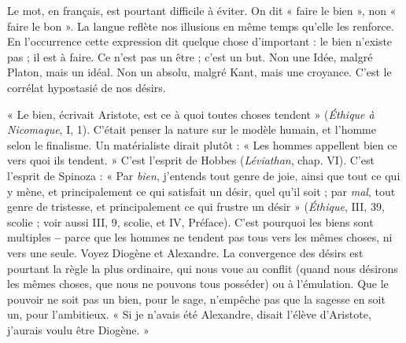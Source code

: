 Le mot, en français, est pourtant difficile à éviter. On dit « faire le bien »,
non « faire le bon ». La langue reflète nos illusions en même temps qu’elle les
renforce. En l’occurrence cette expression dit quelque chose d’important : le
bien n'existe pas ; il est à faire. Ce n’est pas un être ; c’est un but. Non une
Idée, malgré Platon, mais un idéal. Non un absolu, malgré Kant, mais une
croyance. C’est le corrélat hypostasié de nos désirs.

« Le bien, écrivait Aristote, est ce à quoi toutes choses tendent » ({\it Éthique à
Nicomaque}, I, 1). C'était penser la nature sur le modèle humain, et l’homme
selon le finalisme. Un matérialiste dirait plutôt : « Les hommes appellent bien
ce vers quoi ils tendent. » C’est l’esprit de Hobbes ({\it Léviathan}, chap. VI). C’est
l'esprit de Spinoza : « Par {\it bien}, j'entends tout genre de joie, ainsi que tout ce
qui y mène, et principalement ce qui satisfait un désir, quel qu’il soit ; par {\it mal},
tout genre de tristesse, et principalement ce qui frustre un désir » ({\it Éthique}, III,
39, scolie ; voir aussi III, 9, scolie, et IV, Préface). C’est pourquoi les biens sont
multiples {\bf --} parce que les hommes ne tendent pas tous vers les mêmes choses,
ni vers une seule. Voyez Diogène et Alexandre. La convergence des désirs est
pourtant la règle la plus ordinaire, qui nous voue au conflit (quand nous désirons
les mêmes choses, que nous ne pouvons tous posséder) ou à l’émulation.
Que le pouvoir ne soit pas un bien, pour le sage, n'empêche pas que la sagesse
en soit un, pour l’ambitieux. « Si je n’avais été Alexandre, disait l'élève d’Aristote,
j'aurais voulu être Diogène. »

